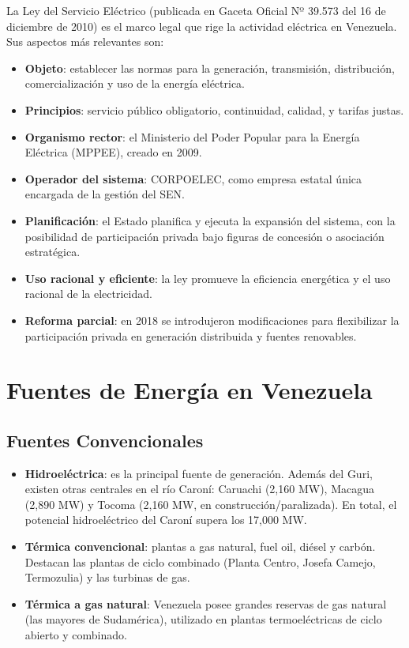 \documentclass[12pt,a4paper]{article}
\begin{document}
La Ley del Servicio Eléctrico (publicada en Gaceta Oficial Nº 39.573
del 16 de diciembre de 2010) es el marco legal que rige la actividad
eléctrica en Venezuela. Sus aspectos más relevantes son:

\begin{itemize}[nosep]
    \item \textbf{Objeto}: establecer las normas para la generación,
          transmisión, distribución, comercialización y uso de la
          energía eléctrica.
    \item \textbf{Principios}: servicio público obligatorio,
          continuidad, calidad, y tarifas justas.
    \item \textbf{Organismo rector}: el Ministerio del Poder Popular
          para la Energía Eléctrica (MPPEE), creado en 2009.
    \item \textbf{Operador del sistema}: CORPOELEC, como empresa
          estatal única encargada de la gestión del SEN.
    \item \textbf{Planificación}: el Estado planifica y ejecuta la
          expansión del sistema, con la posibilidad de participación
          privada bajo figuras de concesión o asociación estratégica.
    \item \textbf{Uso racional y eficiente}: la ley promueve la
          eficiencia energética y el uso racional de la electricidad.
    \item \textbf{Reforma parcial}: en 2018 se introdujeron
          modificaciones para flexibilizar la participación privada en
          generación distribuida y fuentes renovables.
\end{itemize}

\section{Fuentes de Energía en Venezuela}

\subsection{Fuentes Convencionales}

\begin{itemize}[nosep]
    \item \textbf{Hidroeléctrica}: es la principal fuente de generación.
          Además del Guri, existen otras centrales en el río Caroní:
          Caruachi (2,160 MW), Macagua (2,890 MW) y Tocoma (2,160 MW,
          en construcción/paralizada). En total, el potencial
          hidroeléctrico del Caroní supera los 17,000 MW.
    \item \textbf{Térmica convencional}: plantas a gas natural, fuel
          oil, diésel y carbón. Destacan las plantas de ciclo combinado
          (Planta Centro, Josefa Camejo, Termozulia) y las turbinas de
          gas.
    \item \textbf{Térmica a gas natural}: Venezuela posee grandes
          reservas de gas natural (las mayores de Sudamérica), utilizado
          en plantas termoeléctricas de ciclo abierto y combinado.
\end{itemize}
\end{document}
